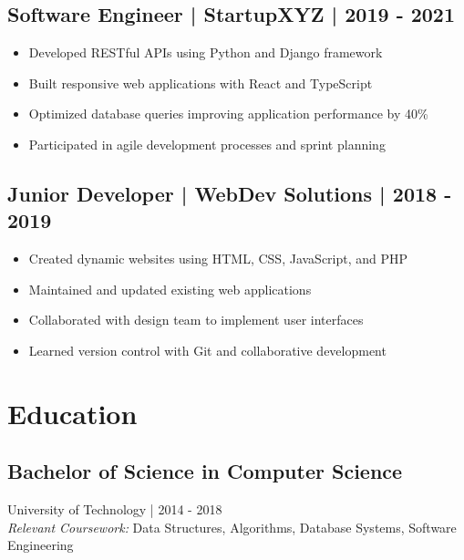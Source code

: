 \documentclass[11pt,a4paper]{article}
\begin{document}
\vspace{0.2cm}

\subsection*{Software Engineer | StartupXYZ | 2019 - 2021}
\begin{itemize}[noitemsep]
    \item Developed RESTful APIs using Python and Django framework
    \item Built responsive web applications with React and TypeScript
    \item Optimized database queries improving application performance by 40\%
    \item Participated in agile development processes and sprint planning
\end{itemize}

\vspace{0.2cm}

\subsection*{Junior Developer | WebDev Solutions | 2018 - 2019}
\begin{itemize}[noitemsep]
    \item Created dynamic websites using HTML, CSS, JavaScript, and PHP
    \item Maintained and updated existing web applications
    \item Collaborated with design team to implement user interfaces
    \item Learned version control with Git and collaborative development
\end{itemize}

\vspace{0.3cm}

\section*{Education}

\subsection*{Bachelor of Science in Computer Science}
University of Technology | 2014 - 2018 \\
\textit{Relevant Coursework:} Data Structures, Algorithms, Database Systems, Software Engineering
\end{document}
